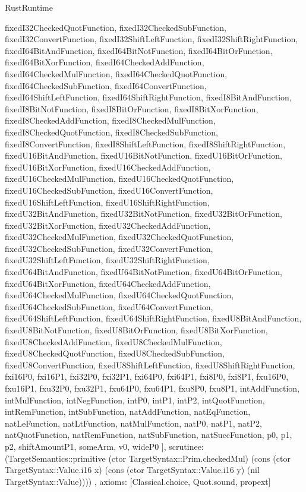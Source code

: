 \begin{lexlean}{RustRuntime}
\begin{semanticmodule}
{{      fixedI32CheckedQuotFunction,
      fixedI32CheckedSubFunction,
      fixedI32ConvertFunction,
      fixedI32ShiftLeftFunction,
      fixedI32ShiftRightFunction,
      fixedI64BitAndFunction,
      fixedI64BitNotFunction,
      fixedI64BitOrFunction,
      fixedI64BitXorFunction,
      fixedI64CheckedAddFunction,
      fixedI64CheckedMulFunction,
      fixedI64CheckedQuotFunction,
      fixedI64CheckedSubFunction,
      fixedI64ConvertFunction,
      fixedI64ShiftLeftFunction,
      fixedI64ShiftRightFunction,
      fixedI8BitAndFunction,
      fixedI8BitNotFunction,
      fixedI8BitOrFunction,
      fixedI8BitXorFunction,
      fixedI8CheckedAddFunction,
      fixedI8CheckedMulFunction,
      fixedI8CheckedQuotFunction,
      fixedI8CheckedSubFunction,
      fixedI8ConvertFunction,
      fixedI8ShiftLeftFunction,
      fixedI8ShiftRightFunction,
      fixedU16BitAndFunction,
      fixedU16BitNotFunction,
      fixedU16BitOrFunction,
      fixedU16BitXorFunction,
      fixedU16CheckedAddFunction,
      fixedU16CheckedMulFunction,
      fixedU16CheckedQuotFunction,
      fixedU16CheckedSubFunction,
      fixedU16ConvertFunction,
      fixedU16ShiftLeftFunction,
      fixedU16ShiftRightFunction,
      fixedU32BitAndFunction,
      fixedU32BitNotFunction,
      fixedU32BitOrFunction,
      fixedU32BitXorFunction,
      fixedU32CheckedAddFunction,
      fixedU32CheckedMulFunction,
      fixedU32CheckedQuotFunction,
      fixedU32CheckedSubFunction,
      fixedU32ConvertFunction,
      fixedU32ShiftLeftFunction,
      fixedU32ShiftRightFunction,
      fixedU64BitAndFunction,
      fixedU64BitNotFunction,
      fixedU64BitOrFunction,
      fixedU64BitXorFunction,
      fixedU64CheckedAddFunction,
      fixedU64CheckedMulFunction,
      fixedU64CheckedQuotFunction,
      fixedU64CheckedSubFunction,
      fixedU64ConvertFunction,
      fixedU64ShiftLeftFunction,
      fixedU64ShiftRightFunction,
      fixedU8BitAndFunction,
      fixedU8BitNotFunction,
      fixedU8BitOrFunction,
      fixedU8BitXorFunction,
      fixedU8CheckedAddFunction,
      fixedU8CheckedMulFunction,
      fixedU8CheckedQuotFunction,
      fixedU8CheckedSubFunction,
      fixedU8ConvertFunction,
      fixedU8ShiftLeftFunction,
      fixedU8ShiftRightFunction,
      fxi16P0,
      fxi16P1,
      fxi32P0,
      fxi32P1,
      fxi64P0,
      fxi64P1,
      fxi8P0,
      fxi8P1,
      fxu16P0,
      fxu16P1,
      fxu32P0,
      fxu32P1,
      fxu64P0,
      fxu64P1,
      fxu8P0,
      fxu8P1,
      intAddFunction,
      intMulFunction,
      intNegFunction,
      intP0,
      intP1,
      intP2,
      intQuotFunction,
      intRemFunction,
      intSubFunction,
      natAddFunction,
      natEqFunction,
      natLeFunction,
      natLtFunction,
      natMulFunction,
      natP0,
      natP1,
      natP2,
      natQuotFunction,
      natRemFunction,
      natSubFunction,
      natSuccFunction,
      p0,
      p1,
      p2,
      shiftAmountP1,
      someArm,
      v0,
      wideP0
    ],
    scrutinee: (TargetSemantics::primitive (ctor TargetSyntax::Prim.checkedMul) (cons (ctor TargetSyntax::Value.i16 x) (cons (ctor TargetSyntax::Value.i16 y) (nil TargetSyntax::Value))))
  },
  axioms: [Classical.choice, Quot.sound, propext]
}


\end{semanticmodule}
\end{lexlean}

